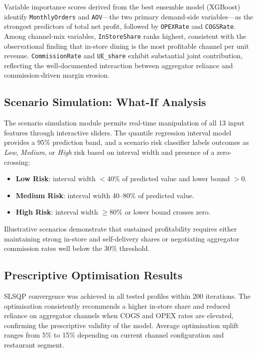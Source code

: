 \documentclass[10pt,a4paper,twocolumn]{article}
\begin{document}
Variable importance scores derived from the best ensemble model (XGBoost) identify
\texttt{MonthlyOrders} and \texttt{AOV}---the two primary demand-side variables---as
the strongest predictors of total net profit, followed by \texttt{OPEXRate} and
\texttt{COGSRate}. Among channel-mix variables, \texttt{InStoreShare} ranks highest,
consistent with the observational finding that in-store dining is the most profitable
channel per unit revenue. \texttt{CommissionRate} and \texttt{UE\_share} exhibit
substantial joint contribution, reflecting the well-documented interaction between
aggregator reliance and commission-driven margin erosion.

\subsection{Scenario Simulation: What-If Analysis}

The scenario simulation module permits real-time manipulation of all 13 input features
through interactive sliders. The quantile regression interval model provides a 95\%
prediction band, and a scenario risk classifier labels outcomes as \textit{Low},
\textit{Medium}, or \textit{High} risk based on interval width and presence of a
zero-crossing:

\begin{itemize}[leftmargin=*, itemsep=1pt]
  \item \textbf{Low Risk}: interval width $< 40\%$ of predicted value and lower bound $> 0$.
  \item \textbf{Medium Risk}: interval width 40--80\% of predicted value.
  \item \textbf{High Risk}: interval width $\geq 80\%$ or lower bound crosses zero.
\end{itemize}

Illustrative scenarios demonstrate that sustained profitability requires either
maintaining strong in-store and self-delivery shares or negotiating aggregator
commission rates well below the 30\% threshold.

\subsection{Prescriptive Optimisation Results}

SLSQP convergence was achieved in all tested profiles within 200 iterations. The
optimisation consistently recommends a higher in-store share and reduced reliance on
aggregator channels when COGS and OPEX rates are elevated, confirming the prescriptive
validity of the model. Average optimisation uplift ranges from 5\% to 15\% depending
on current channel configuration and restaurant segment.
\end{document}
